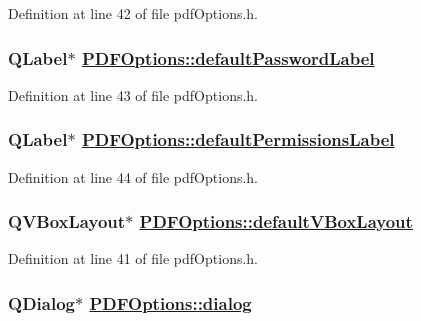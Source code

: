 Definition at line 42 of file pdf\-Options.h.\hypertarget{classPDFOptions_r8}{
\subsubsection[defaultPasswordLabel]{\setlength{\rightskip}{0pt plus 5cm}QLabel$\ast$ \hyperlink{classPDFOptions_r8}{PDFOptions::default\-Password\-Label}}}
\label{classPDFOptions_r8}


Definition at line 43 of file pdf\-Options.h.\hypertarget{classPDFOptions_r9}{
\subsubsection[defaultPermissionsLabel]{\setlength{\rightskip}{0pt plus 5cm}QLabel$\ast$ \hyperlink{classPDFOptions_r9}{PDFOptions::default\-Permissions\-Label}}}
\label{classPDFOptions_r9}


Definition at line 44 of file pdf\-Options.h.\hypertarget{classPDFOptions_r6}{
\subsubsection[defaultVBoxLayout]{\setlength{\rightskip}{0pt plus 5cm}QVBox\-Layout$\ast$ \hyperlink{classPDFOptions_r6}{PDFOptions::default\-VBox\-Layout}}}
\label{classPDFOptions_r6}


Definition at line 41 of file pdf\-Options.h.\hypertarget{classPDFOptions_r44}{
\subsubsection[dialog]{\setlength{\rightskip}{0pt plus 5cm}QDialog$\ast$ \hyperlink{classPDFOptions_r1}{PDFOptions::dialog}}}
\label{classPDFOptions_r44}


